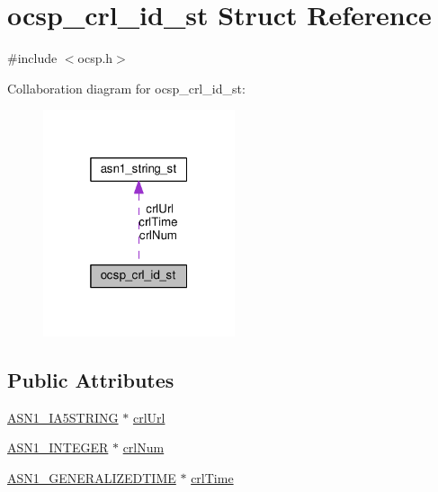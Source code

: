 \hypertarget{structocsp__crl__id__st}{}\section{ocsp\+\_\+crl\+\_\+id\+\_\+st Struct Reference}
\label{structocsp__crl__id__st}


{\ttfamily \#include $<$ocsp.\+h$>$}



Collaboration diagram for ocsp\+\_\+crl\+\_\+id\+\_\+st\+:
\nopagebreak
\begin{figure}[H]
\begin{center}
\leavevmode
\includegraphics[width=160pt]{structocsp__crl__id__st__coll__graph}
\end{center}
\end{figure}
\subsection*{Public Attributes}
\begin{DoxyCompactItemize}
\item 
\hyperlink{ossl__typ_8h_a0d915c339a64c1c9871d5404e51c44fd}{A\+S\+N1\+\_\+\+I\+A5\+S\+T\+R\+I\+NG} $\ast$ \hyperlink{structocsp__crl__id__st_a1054ab5bca3c14bd95723caf35a02dc7}{crl\+Url}
\item 
\hyperlink{ossl__typ_8h_af4335399bf9774cb410a5e93de65998b}{A\+S\+N1\+\_\+\+I\+N\+T\+E\+G\+ER} $\ast$ \hyperlink{structocsp__crl__id__st_a65c4311de0c943b5e162c7ce6091b74e}{crl\+Num}
\item 
\hyperlink{ossl__typ_8h_abd19ea5b527807ce3a516e6a41440f84}{A\+S\+N1\+\_\+\+G\+E\+N\+E\+R\+A\+L\+I\+Z\+E\+D\+T\+I\+ME} $\ast$ \hyperlink{structocsp__crl__id__st_ac837981de065fbf9415d54739fedc2f5}{crl\+Time}
\end{DoxyCompactItemize}


